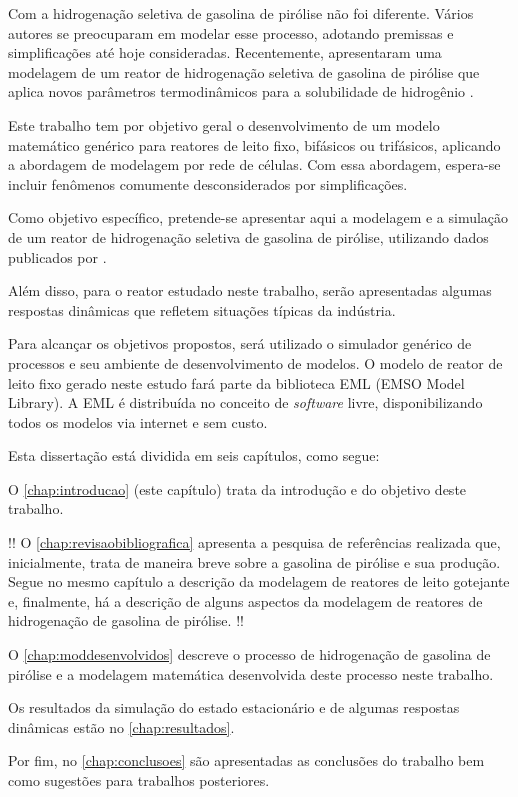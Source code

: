 Com a hidrogenação seletiva de gasolina de pirólise não
foi diferente. Vários autores se preocuparam em modelar esse
processo, adotando premissas e simplificações até hoje consideradas.
Recentemente,  apresentaram uma modelagem de
um reator de hidrogenação seletiva de gasolina de pirólise que aplica novos
parâmetros termodinâmicos para a solubilidade de hidrogênio \cite{Rojas2014}. 

Este trabalho tem por objetivo geral o desenvolvimento de um modelo
matemático genérico para reatores de leito fixo, bifásicos ou trifásicos,
aplicando a abordagem de modelagem por rede de células. Com essa
abordagem, espera-se incluir fenômenos comumente desconsiderados por
simplificações.

Como objetivo específico, pretende-se apresentar aqui a modelagem e a
simulação de um reator de hidrogenação seletiva de gasolina de pirólise,
utilizando dados publicados por .

Além disso, para o reator estudado neste trabalho, serão
apresentadas algumas respostas dinâmicas que refletem situações típicas da
indústria.

Para alcançar os objetivos propostos, será utilizado o simulador genérico de
processos \emso{} \cite{Soares2003} e seu ambiente de desenvolvimento de
modelos. O modelo de reator de leito fixo gerado neste estudo fará parte da
biblioteca EML (EMSO Model Library). A EML é distribuída no conceito de
\emph{software} livre, disponibilizando todos os modelos via internet e sem custo.

Esta dissertação está dividida em seis capítulos, como segue:

O \autoref{chap:introducao} (este capítulo) trata da introdução e do objetivo
deste trabalho.

!! O \autoref{chap:revisaobibliografica} apresenta a pesquisa de referências
realizada que, inicialmente, trata de maneira breve sobre a gasolina de pirólise
e sua produção. Segue no mesmo capítulo a descrição da modelagem de reatores de
leito gotejante e, finalmente, há a descrição de alguns aspectos da
modelagem de reatores de hidrogenação de gasolina de pirólise. !!

O \autoref{chap:moddesenvolvidos} descreve o processo de
hidrogenação de gasolina de pirólise e a modelagem matemática
desenvolvida deste processo neste trabalho.

Os resultados da simulação do estado estacionário e de algumas
respostas dinâmicas estão no \autoref{chap:resultados}.

Por fim, no \autoref{chap:conclusoes} são apresentadas as conclusões do
trabalho bem como sugestões para trabalhos posteriores.
